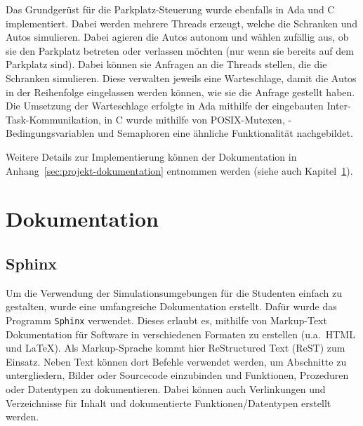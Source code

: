\documentclass[oneside]{elaboration}
\begin{document}
Das Grundgerüst für die Parkplatz-Steuerung wurde ebenfalls in Ada und C
implementiert. Dabei werden mehrere Threads erzeugt, welche die Schranken und
Autos simulieren. Dabei agieren die Autos autonom und wählen zufällig aus, ob
sie den Parkplatz betreten oder verlassen möchten (nur wenn sie bereits auf dem
Parkplatz sind). Dabei können sie Anfragen an die Threads stellen, die die
Schranken simulieren. Diese verwalten jeweils eine Warteschlage, damit die Autos
in der Reihenfolge eingelassen werden können, wie sie die Anfrage gestellt
haben. Die Umsetzung der Warteschlage erfolgte in Ada mithilfe der eingebauten
Inter-Task-Kommunikation, in C wurde mithilfe von POSIX-Mutexen,
-Bedingungsvariablen und Semaphoren eine ähnliche Funktionalität nachgebildet.

Weitere Details zur Implementierung können der Dokumentation in
Anhang~\ref{sec:projekt-dokumentation} entnommen werden (siehe auch
Kapitel~\ref{sec:dokumentation}).

\section{Dokumentation}
\label{sec:dokumentation}

\subsection{Sphinx}
\label{sec:sphinx}

Um die Verwendung der Simulationsumgebungen für die Studenten einfach zu
gestalten, wurde eine umfangreiche Dokumentation erstellt. Dafür wurde das
Programm \texttt{Sphinx} verwendet. Dieses erlaubt es, mithilfe von Markup-Text
Dokumentation für Software in verschiedenen Formaten zu erstellen (u.a.\ HTML
und LaTeX). Als Markup-Sprache kommt hier ReStructured Text (ReST) zum Einsatz.
Neben Text können dort Befehle verwendet werden, um Abschnitte zu untergliedern,
Bilder oder Sourcecode einzubinden und Funktionen, Prozeduren oder Datentypen zu
dokumentieren. Dabei können auch Verlinkungen und Verzeichnisse für Inhalt und
dokumentierte Funktionen/Datentypen erstellt werden.
\end{document}
